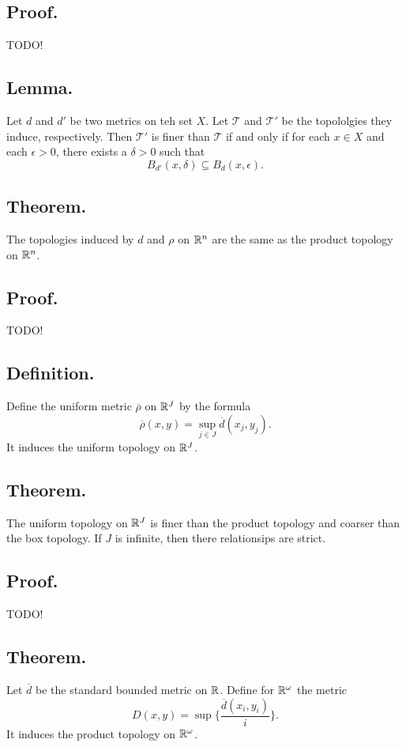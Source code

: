 \documentclass[titlepage]{article}
\begin{document}
\subsection{Proof.} TODO!

\subsection{Lemma.} Let $d$ and $d'$ be two metrics on teh set $X$. Let $\mathcal{T}$ and $\mathcal{T}'$ be the topololgies they induce, respectively. Then $\mathcal{T}'$ is finer than $\mathcal{T}$ if and only if for each $x \in X$ and each $\epsilon > 0$, there exists a $\delta > 0$ such that 
$$B_{d'}(x, \delta) \subseteq B_{d}(x, \epsilon).$$

\subsection{Theorem.} The topologies induced by $d$ and $\rho$ on $\mathbb{R}^{n}$ are the same as the product topology on $\mathbb{R}^{n}$.

\subsection{Proof.} TODO!

\subsection{Definition.} Define the uniform metric $\overline{\rho}$ on $\mathbb{R}^{J}$ by the formula 
$$\overline{\rho}(x, y) = \sup_{j \in J} \overline{d}(x_{j}, y_{j}).$$
It induces the uniform topology on $\mathbb{R}^{J}$.

\subsection{Theorem.} The uniform topology on $\mathbb{R}^{J}$ is finer than the product topology and coarser than the box topology. If $J$ is infinite, then there relationsips are strict.

\subsection{Proof.} TODO!

\subsection{Theorem.} Let $\overline{d}$ be the standard bounded metric on $\mathbb{R}$. Define for $\mathbb{R}^{\omega}$ the metric 
$$D(x, y) = \sup \{\frac{\overline{d}(x_{i}, y_{i})}{i}\}.$$
It induces the product topology on $\mathbb{R}^{\omega}$.
\end{document}
